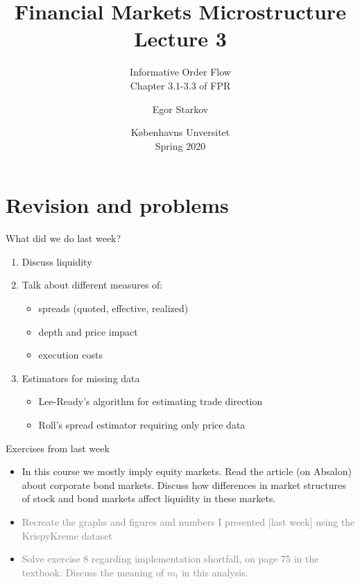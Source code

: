 \documentclass[english,10pt]{beamer}
\title{Financial Markets Microstructure \\ Lecture 3}
\subtitle{Informative Order Flow\\
	Chapter 3.1-3.3 of FPR}
\author{Egor Starkov}
\date{K{\o}benhavns Unversitet \\
	Spring 2020}
\begin{document}
	\frame[plain]{\titlepage}
	\addtocounter{framenumber}{-1}

\section{Revision and problems}

\begin{frame}{What did we do last week?}
\begin{enumerate}
	\item Discuss liquidity
	\item Talk about different measures of:
	\begin{itemize}
		\item spreads (quoted, effective, realized)
		\item depth and price impact
		\item execution costs
	\end{itemize}
	\item Estimators for missing data
	\begin{itemize}
		\item Lee-Ready's algorithm for estimating trade direction
		\item Roll's spread estimator requiring only price data
	\end{itemize}
\end{enumerate}
\end{frame}


\begin{frame}{Exercises from last week}
	\begin{itemize}
		\item In this course we mostly imply equity markets. Read the article (on Absalon) about corporate bond markets. Discuss how differences in market structures of stock and bond markets affect liquidity in these markets.
		\item \textcolor{gray}{Recreate the graphs and figures and numbers I presented [last week] using the KrispyKreme dataset}
		\item \textcolor{gray}{Solve exercise 8 regarding implementation shortfall, on page 75 in the textbook.
		Discuss the meaning of $m_t$ in this analysis.}
	\end{itemize}
\end{frame}
\end{document}

